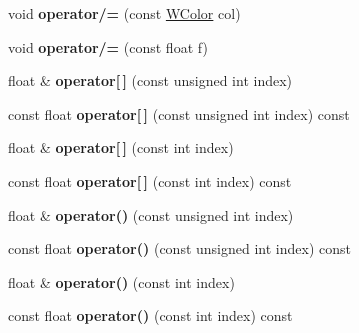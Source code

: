 \begin{DoxyCompactItemize}
\item 
void {\bfseries operator/=} (const \hyperlink{class_w_color}{W\+Color} col)\hypertarget{class_w_color_add8d77caf11f1c0e8235b3fa74692efc}{}\label{class_w_color_add8d77caf11f1c0e8235b3fa74692efc}

\item 
void {\bfseries operator/=} (const float f)\hypertarget{class_w_color_a6b0b3acf6841764fb82384567b96dd8e}{}\label{class_w_color_a6b0b3acf6841764fb82384567b96dd8e}

\item 
float \& {\bfseries operator\mbox{[}$\,$\mbox{]}} (const unsigned int index)\hypertarget{class_w_color_a5ae7ed83d4a85c202c8eb4720d14c5f7}{}\label{class_w_color_a5ae7ed83d4a85c202c8eb4720d14c5f7}

\item 
const float {\bfseries operator\mbox{[}$\,$\mbox{]}} (const unsigned int index) const \hypertarget{class_w_color_ab91a9be2af138122e31898cb98a2e91c}{}\label{class_w_color_ab91a9be2af138122e31898cb98a2e91c}

\item 
float \& {\bfseries operator\mbox{[}$\,$\mbox{]}} (const int index)\hypertarget{class_w_color_a718fd12567cccd948deacf892c446f84}{}\label{class_w_color_a718fd12567cccd948deacf892c446f84}

\item 
const float {\bfseries operator\mbox{[}$\,$\mbox{]}} (const int index) const \hypertarget{class_w_color_af83a4694ef5d421f04a1ef165b1c7979}{}\label{class_w_color_af83a4694ef5d421f04a1ef165b1c7979}

\item 
float \& {\bfseries operator()} (const unsigned int index)\hypertarget{class_w_color_ae1e3db9bfe624a8bc1e804c6b5767ab2}{}\label{class_w_color_ae1e3db9bfe624a8bc1e804c6b5767ab2}

\item 
const float {\bfseries operator()} (const unsigned int index) const \hypertarget{class_w_color_a75bae865ab87d24275b849fdde6479e5}{}\label{class_w_color_a75bae865ab87d24275b849fdde6479e5}

\item 
float \& {\bfseries operator()} (const int index)\hypertarget{class_w_color_a352fc62cb9f7654b94ed839112cc44f5}{}\label{class_w_color_a352fc62cb9f7654b94ed839112cc44f5}

\item 
const float {\bfseries operator()} (const int index) const \hypertarget{class_w_color_ae5893f27647e8d498ef75c4c8af01f73}{}\label{class_w_color_ae5893f27647e8d498ef75c4c8af01f73}


\end{DoxyCompactItemize}
